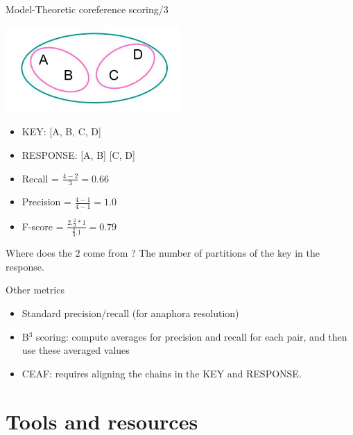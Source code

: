 \documentclass[dvipsnames, 10pt, compress]{beamer}
\begin{document}
\begin{frame}{Model-Theoretic coreference scoring/3}

\begin{center}
\includegraphics[width=0.5\textwidth]{graphics/coref-scoring-1.png}
\end{center}

\begin{itemize}
  \item KEY: [A, B, C, D]
  \item RESPONSE: [A, B] [C, D]
\end{itemize}

\begin{itemize}
  \item Recall = $\frac{4 - 2}{3} = 0.66$
  \item Precision = $\frac{4 - 1}{4 - 1} = 1.0$
  \item F-score = $\frac{2 . \frac{2}{3} * 1}{\frac{2}{3} . 1} = 0.79$
\end{itemize}

Where does the $2$ come from ? The number of partitions of the key in the response.

\end{frame}

\begin{frame}{Other metrics}

\begin{itemize}
  \item Standard precision/recall (for anaphora resolution)
   \item B$^3$ scoring: compute averages for precision and recall for each pair, and then use these averaged values
    \item CEAF: requires aligning the chains in the KEY and RESPONSE.
\end{itemize}

\end{frame}

\section{Tools and resources}
\end{document}

